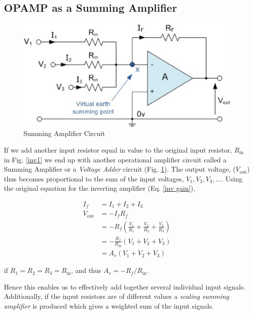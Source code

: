 
\subsection{OPAMP as a Summing Amplifier}

\begin{figure}[H]
    \centering
    \includegraphics[width=0.8\columnwidth]{images/sum1.png}
    \caption{Summing Amplifier Circuit}
    \label{sum1}
\end{figure}

If we add another input resistor equal in value to the original input resistor, $R_\text{in}$ in Fig. \ref{inv1} we end up with another operational amplifier circuit called a Summing Amplifier or a \textit{Voltage Adder} circuit (Fig. \ref{sum1}). The output voltage, ($V_\text{out}$) thus becomes proportional to the sum of the input voltages, $V_1, V_2, V_3, \dots$. Using the original equation for the inverting amplifier (Eq. \ref{inv gain}),

\begin{align}
    I_f &= I_1 + I_2 + I_3 \nonumber \\
    V_\text{out} &= -I_f R_f \nonumber \\
    &= -R_f \left(\frac{V_1}{R_1} + \frac{V_2}{R_2} + \frac{V_3}{R_3}\right) \nonumber \\
    &= -\frac{R_f}{R_\text{in}} (V_1 + V_2 + V_3) \nonumber \\
    &= A_v (V_1 + V_2 + V_3)
\end{align}

if $R_1 = R_2 = R_3 = R_\text{in}$, and thus $A_v=-R_f/R_\text{in}$.

Hence this enables us to effectively add together several individual input signals. Additionally, if the input resistors are of different values a \textit{scaling summing amplifier} is produced which gives a weighted sum of the input signals.

